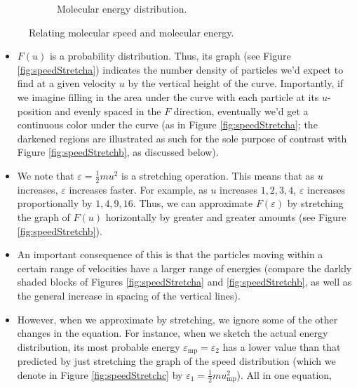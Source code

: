 \documentclass[../notes.tex]{subfiles}
\begin{document}
\begin{itemize}
\begin{figure}[h!]
\begin{subfigure}[b]{0.49\linewidth}
            \caption{Molecular energy distribution.}
            \label{fig:speedStretchd}
        \end{subfigure}
        \caption{Relating molecular speed and molecular energy.}
        \label{fig:speedStretch}
    \end{figure}
    \begin{itemize}
        \item $F(u)$ is a probability distribution. Thus, its graph (see Figure \ref{fig:speedStretcha}) indicates the number density of particles we'd expect to find at a given velocity $u$ by the vertical height of the curve. Importantly, if we imagine filling in the area under the curve with each particle at its $u$-position and evenly spaced in the $F$ direction, eventually we'd get a continuous color under the curve (as in Figure \ref{fig:speedStretcha}; the darkened regions are illustrated as such for the sole purpose of contrast with Figure \ref{fig:speedStretchb}, as discussed below).
        \item We note that $\varepsilon=\frac{1}{2}mu^2$ is a stretching operation. This means that as $u$ increases, $\varepsilon$ increases faster. For example, as $u$ increases $1,2,3,4$, $\varepsilon$ increases proportionally by $1,4,9,16$. Thus, we can approximate $F(\varepsilon)$ by stretching the graph of $F(u)$ horizontally by greater and greater amounts (see Figure \ref{fig:speedStretchb}).
        \item An important consequence of this is that the particles moving within a certain range of velocities have a larger range of energies (compare the darkly shaded blocks of Figures \ref{fig:speedStretcha} and \ref{fig:speedStretchb}, as well as the general increase in spacing of the vertical lines).
        \item However, when we approximate by stretching, we ignore some of the other changes in the equation. For instance, when we sketch the actual energy distribution, its most probable energy $\varepsilon_\text{mp}=\varepsilon_2$ has a lower value than that predicted by just stretching the graph of the speed distribution (which we denote in Figure \ref{fig:speedStretchc} by $\varepsilon_1=\frac{1}{2}mu_\text{mp}^2$). All in one equation,

\end{itemize}
\end{itemize}
\end{document}
